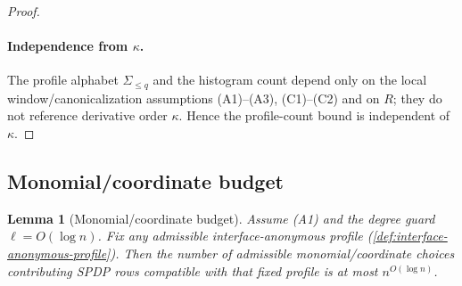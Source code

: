 \documentclass[12pt]{article}
\newtheorem{lemma}[theorem]{Lemma}
\theoremstyle{definition}
\theoremstyle{remark}
\begin{document}
\begin{proof}
\paragraph{Independence from $\kappa$.}
The profile alphabet $\Sigma_{\le q}$ and the histogram count depend only on the
local window/canonicalization assumptions (A1)--(A3), (C1)--(C2) and on $R$;
they do not reference derivative order $\kappa$. Hence the profile-count bound is
independent of $\kappa$.
\end{proof}

\subsection{Monomial/coordinate budget}
\label{subsec:monomial-coordinate-budget}

\begin{lemma}[Monomial/coordinate budget]
\label{lem:monomial-coordinate-budget}
Assume (A1) and the degree guard $\ell = O(\log n)$. Fix any admissible
interface-anonymous profile (\ref{def:interface-anonymous-profile}). Then the
number of admissible monomial/coordinate choices contributing SPDP rows
compatible with that fixed profile is at most $n^{O(\log n)}$.
\end{lemma}
\end{document}
